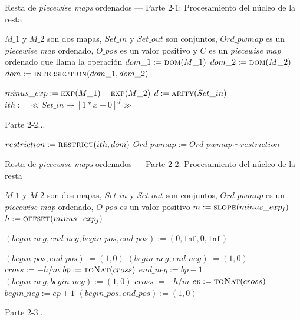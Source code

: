 \begin{algorithm}
\caption{Resta de \textit{piecewise maps} ordenados — Parte 2-1: Procesamiento del núcleo de la resta}
\label{alg:resta-nuecleo-ord1}
\begin{algorithmic}[1]
\Require $M\_1$ y $M\_2$ son dos mapas, $Set\_in$ y $Set\_out$ son conjuntos, $Ord\_pwmap$ es un \textit{piecewise map} ordenado, $O\_pos$ es un valor positivo y $C$ es un \textit{piecewise map} ordenado que llama la operación
     \State $dom\_1 :=\Call{dom}{M\_1}$
     \State $dom\_2 :=\Call{dom}{M\_2}$
    \State $dom := \Call{intersection}{dom\_1,dom\_2}$
        \State \Return
    \EndIf

    \State $minus\_exp := \Call{exp}{M\_1} - \Call{exp}{M\_2}$
     \State$d := \Call{arity}{Set\_in}$
    \State $ith := \ll Set\_in \mapsto [1*x+0]^d \gg$

    \State Parte 2-2...

    \State $restriction :=  \Call{restrict}{ith, dom}$
    \State $Ord\_pwmap := Ord\_pwmap \frown restriction $
    \State \Return
\EndFunction
\end{algorithmic}
\end{algorithm}

\begin{algorithm}
\caption{Resta de \textit{piecewise maps} ordenados — Parte 2-2: Procesamiento del núcleo de la resta}
\label{alg:resta-nuecleo-ord2}
\begin{algorithmic}[1]
\Require $M\_1$ y $M\_2$ son dos mapas, $Set\_in$ y $Set\_out$ son conjuntos, $Ord\_pwmap$ es un \textit{piecewise map} ordenado, $O\_pos$ es un valor positivo
        \State $m := \Call{slope}{minus\_exp_j}$
        \State $h := \Call{offset}{minus\_exp_j}$

        \State $(begin\_neg,end\_neg,begin\_pos,end\_pos) := (0,\texttt{Inf},0,\texttt{Inf})$

        \State $(begin\_pos,end\_pos) := (1,0)$
      \Else
        \State $(begin\_neg,end\_neg) := (1,0)$
      \EndIf
      \State $cross := -h / m$
        \State $bp := \Call{toNat}{cross}$ 
          \State $end\_neg := bp - 1$
        \Else
          \State $(begin\_neg,begin\_neg) := (1,0)$
        \EndIf
      \EndIf
    \Else
      \State $cross := -h / m$
        \State $ep := \Call{toNat}{cross}$
          \State $begin\_neg := ep + 1$
        \EndIf
      \Else
        \State $(begin\_pos,end\_pos) := (1,0)$
      \EndIf
    \EndIf

       \State Parte 2-3...
    \EndFor

\EndFunction
\end{algorithmic}
\end{algorithm}




